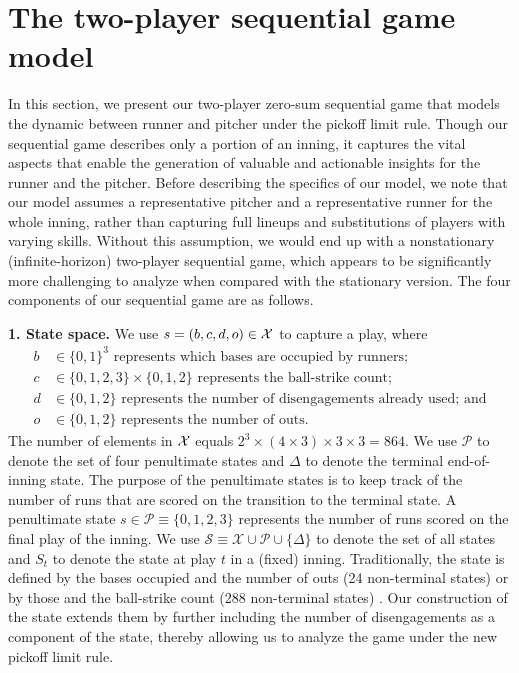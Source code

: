 \documentclass[11pt]{article}
\begin{document}
    \section{The two-player sequential game model}
    \label{sec:sg-model}
    In this section, we present our two-player zero-sum sequential game that models the dynamic between runner and pitcher under the pickoff limit rule. Though our sequential game describes only a portion of an inning, it captures the vital aspects that enable the generation of valuable and actionable insights for the runner and the pitcher. Before describing the specifics of our model, we note that our model assumes a representative pitcher and a representative runner for the whole inning, rather than capturing full lineups and substitutions of players with varying skills. Without this assumption, we would end up with a nonstationary (infinite-horizon) two-player sequential game, which appears to be significantly more challenging to analyze when compared with the stationary version. The four components of our sequential game are as follows.

    {\bf 1. State space.} We use $s=(b,c,d,o) \in {\cal X}$ to capture a play, where     
    \begin{align*}
      b &\in \{0, 1\}^3 \text{ represents which bases are occupied by runners};\\
      c &\in \{0, 1, 2, 3\} \times \{0, 1, 2\} \text{ represents the ball-strike count};\\
      d &\in \{0, 1, 2\} \text{ represents the number of disengagements already used; and}\\
      o &\in \{0, 1, 2\} \text{ represents the number of outs}.
    \end{align*}
    The number of elements in ${\cal X}$ equals $2^3 \times (4 \times 3) \times 3 \times 3 = 864$. We use $\mathcal P$ to denote the set of four penultimate states and $\Delta$ to denote the terminal end-of-inning state. The purpose of the penultimate states is to keep track of the number of runs that are scored on the transition to the terminal state. A penultimate state $s \in \mathcal{P} \equiv \{0, 1, 2, 3\}$ represents the number of runs scored on the final play of the inning. We use $\mathcal{S} \equiv \mathcal{X} \cup \mathcal{P} \cup \{\Delta\}$ to denote the set of all states and $S_t$ to denote the state at play $t$ in a (fixed) inning. Traditionally, the state is defined by the bases occupied and the number of outs (24 non-terminal states) or by those and the ball-strike count (288 non-terminal states) \parencite{bukiet_markov_1997}. Our construction of the state extends them by further including the number of disengagements as a component of the state, thereby allowing us to analyze the game under the new pickoff limit rule.
\end{document}
